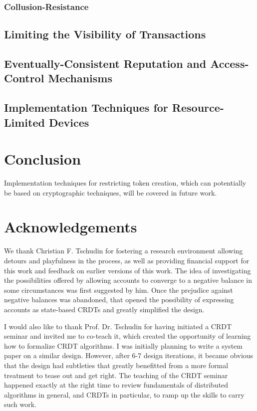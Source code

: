 \documentclass[9pt, oneside]{article}   	%
\begin{document}
	\subsubsection{Collusion-Resistance}

\subsection{Limiting the Visibility of Transactions}

\subsection{Eventually-Consistent Reputation and Access-Control Mechanisms}

\subsection{Implementation Techniques for Resource-Limited Devices}

\section{Conclusion}
\label{sec:conclusion}

Implementation techniques for restricting token creation, which can potentially be based on cryptographic techniques, will be covered in future work.

\section{Acknowledgements}
\label{sec:acknowledgements}

We thank Christian F. Tschudin for fostering a research environment allowing detours and playfulness in the process, as well as providing financial support for this work and feedback on earlier versions of this work. The idea of investigating the possibilities offered by allowing accounts to converge to a negative balance in some circumstances was first suggested by him. Once the prejudice against negative balances was abandoned, that opened the possibility of expressing accounts as state-based CRDTs and greatly simplified the design.

I would also like to thank Prof. Dr. Tschudin for having initiated a CRDT seminar and invited me to co-teach it, which created the opportunity of learning how to formalize CRDT algorithms. I was initially planning to write a system paper on a similar design. However, after 6-7 design iterations, it became obvious that the design had subtleties that greatly benefitted from a more formal treatment to tease out and get right. The teaching of the CRDT seminar happened exactly at the right time to review fundamentals of distributed algorithms in general, and CRDTs in particular, to ramp up the skills to carry such work.
\end{document}
